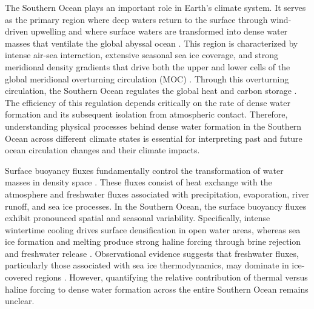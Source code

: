 \documentclass[pdflatex,sn-nature]{sn-jnl}
\begin{document}
The Southern Ocean plays an important role in Earth's climate system. It serves as the primary region where deep waters return to the surface through wind-driven upwelling and where surface waters are transformed into dense water masses that ventilate the global abyssal ocean \cite{Marshall2012,Talley2013}. This region is characterized by intense air-sea interaction, extensive seasonal sea ice coverage, and strong meridional density gradients that drive both the upper and lower cells of the global meridional overturning circulation (MOC) \cite{Speer2000,Lumpkin2007}. Through this overturning circulation, the Southern Ocean regulates the global heat and carbon storage \cite{Marinov2006,Gray2024}. The efficiency of this regulation depends critically on the rate of dense water formation and its subsequent isolation from atmospheric contact. Therefore, understanding physical processes behind dense water formation in the Southern Ocean across different climate states is essential for interpreting past and future ocean circulation changes and their climate impacts.



Surface buoyancy fluxes fundamentally control the transformation of water masses in density space \cite{Walin1982,Speer1992,drake2025water}. These fluxes consist of heat exchange with the atmosphere and freshwater fluxes associated with precipitation, evaporation, river runoff, and sea ice processes. In the Southern Ocean, the surface buoyancy fluxes exhibit pronounced spatial and seasonal variability. Specifically, intense wintertime cooling drives surface densification in open water areas, whereas sea ice formation and melting produce strong haline forcing through brine rejection and freshwater release \cite{Abernathey2016,Pellichero2018}. Observational evidence suggests that freshwater fluxes, particularly those associated with sea ice thermodynamics, may dominate in ice-covered regions \cite{Pellichero2018,Bailey2023}. However, quantifying the relative contribution of thermal versus haline forcing to dense water formation across the entire Southern Ocean remains unclear.
\end{document}
